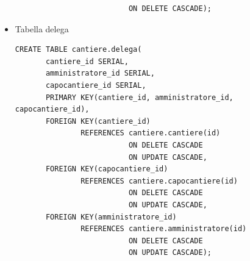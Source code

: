 \documentclass[11pt]{article}
\begin{document}
\begin{itemize}
\begin{verbatim}
                          ON DELETE CASCADE);
\end{verbatim}
\item Tabella delega
\label{sec:org1a3d53d}
\begin{verbatim}
CREATE TABLE cantiere.delega(
       cantiere_id SERIAL,
       amministratore_id SERIAL,
       capocantiere_id SERIAL,
       PRIMARY KEY(cantiere_id, amministratore_id, capocantiere_id),
       FOREIGN KEY(cantiere_id)
               REFERENCES cantiere.cantiere(id)
                          ON DELETE CASCADE
                          ON UPDATE CASCADE,
       FOREIGN KEY(capocantiere_id)
               REFERENCES cantiere.capocantiere(id)
                          ON DELETE CASCADE
                          ON UPDATE CASCADE,
       FOREIGN KEY(amministratore_id)
               REFERENCES cantiere.amministratore(id)
                          ON DELETE CASCADE
                          ON UPDATE CASCADE);
\end{verbatim}
\end{itemize}
\end{document}
